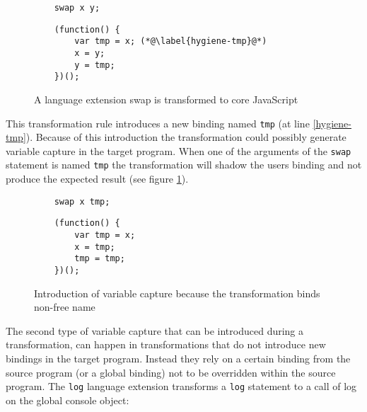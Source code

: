 \begin{figure}[!h]
\begin{minipage}{0.45\textwidth}
	\begin{lstlisting}
	swap x y;
	\end{lstlisting}
\end{minipage}
\hfill
\begin{minipage}{0.45\textwidth}
	\begin{lstlisting}
	(function() {
		var tmp = x; (*@\label{hygiene-tmp}@*)
		x = y;
		y = tmp;
	})();
	\end{lstlisting}
\end{minipage}

\caption{A language extension swap is transformed to core JavaScript}
\end{figure}

This transformation rule introduces a new binding named \lstinline$tmp$ (at line \ref{hygiene-tmp}). Because of this introduction the transformation could possibly generate variable capture in the target program. When one of the arguments of the \lstinline$swap$ statement is named \lstinline$tmp$ the transformation will shadow the users binding and not produce the expected result (see figure \ref{fig:unhygienic}).

\begin{figure}[!h]
\label{fig:unhygienic}
\begin{minipage}{0.45\textwidth}
	\begin{lstlisting}
	swap x tmp;
	\end{lstlisting}
\end{minipage}
\hfill
\begin{minipage}{0.45\textwidth}
	\begin{lstlisting}
	(function() {
		var tmp = x;
		x = tmp;
		tmp = tmp;
	})();
	\end{lstlisting}
\end{minipage}
\caption{Introduction of variable capture because the transformation binds non-free name} \label{fig:unhygienic}
\end{figure}

The second type of variable capture that can be introduced during a transformation, can happen in transformations that do not introduce new bindings in the target program. Instead they rely on a certain binding from the source program (or a global binding) not to be overridden within the source program. The \lstinline$log$ language extension transforms a \lstinline$log$ statement to a call of log on the global console object:

